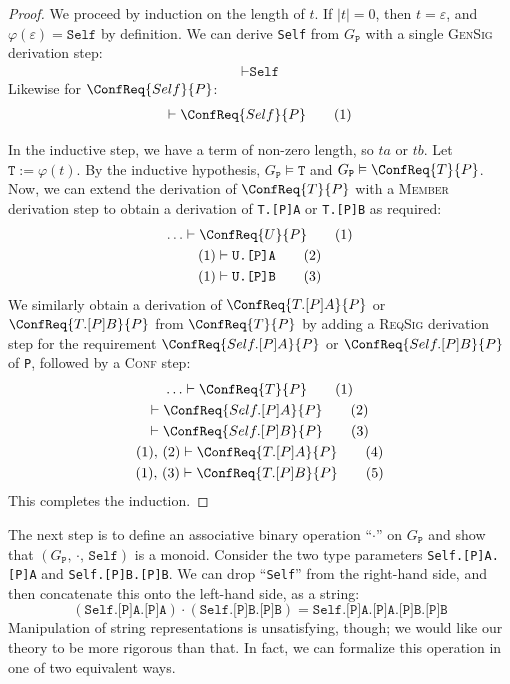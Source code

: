 \documentclass[../generics]{subfiles}
\begin{document}
\begin{proof}
We proceed by induction on the length of $t$. If $|t|=0$, then $t=\varepsilon$, and $\varphi(\varepsilon)=\texttt{Self}$ by definition. We can derive \texttt{Self} from $G_\texttt{P}$ with a single \textsc{GenSig} derivation step:
\begin{gather*}
\vdash\texttt{Self}\tag{1}
\end{gather*}
Likewise for $\ConfReq{Self}{P}$:
\begin{gather*}
\vdash\ConfReq{Self}{P}\tag{1}
\end{gather*}

In the inductive step, we have a term of non-zero length, so $ta$ or $tb$. Let $\texttt{T}:=\varphi(t)$. By the inductive hypothesis, $G_\texttt{P}\vDash\texttt{T}$ and $G_\texttt{P}\vDash\ConfReq{T}{P}$. Now, we can extend the derivation of $\ConfReq{T}{P}$ with a \textsc{Member} derivation step to obtain a derivation of \texttt{T.[P]A} or \texttt{T.[P]B} as required:
\begin{gather*}
\ldots\vdash\ConfReq{U}{P}\tag{1}\\
(1)\vdash\texttt{U.[P]A}\tag{2}\\
(1)\vdash\texttt{U.[P]B}\tag{3}
\end{gather*}
We similarly obtain a derivation of $\ConfReq{T.[P]A}{P}$ or $\ConfReq{T.[P]B}{P}$ from $\ConfReq{T}{P}$ by adding a \textsc{ReqSig} derivation step for the requirement $\ConfReq{Self.[P]A}{P}$ or $\ConfReq{Self.[P]B}{P}$ of \texttt{P}, followed by a \textsc{Conf} step:
\begin{gather*}
\ldots\vdash\ConfReq{T}{P}\tag{1}\\
\vdash\ConfReq{Self.[P]A}{P}\tag{2}\\
\vdash\ConfReq{Self.[P]B}{P}\tag{3}\\
(1),\,(2)\vdash\ConfReq{T.[P]A}{P}\tag{4}\\
(1),\,(3)\vdash\ConfReq{T.[P]B}{P}\tag{5}
\end{gather*}
This completes the induction.
\end{proof}

The next step is to define an associative binary operation ``$\cdot$'' on $G_\texttt{P}$ and show that $(G_\texttt{P},\,\cdot,\,\texttt{Self})$ is a monoid. Consider the two type parameters \texttt{Self.[P]A.[P]A} and \texttt{Self.[P]B.[P]B}. We can drop ``\texttt{Self}'' from the right-hand side, and then concatenate this onto the left-hand side, as a string:
\[(\texttt{Self.[P]A.[P]A})\cdot(\texttt{Self.[P]B.[P]B})=\texttt{Self.[P]A.[P]A.[P]B.[P]B}\]
Manipulation of string representations is unsatisfying, though; we would like our theory to be more rigorous than that. In fact, we can formalize this operation in one of two equivalent ways.
\end{document}

